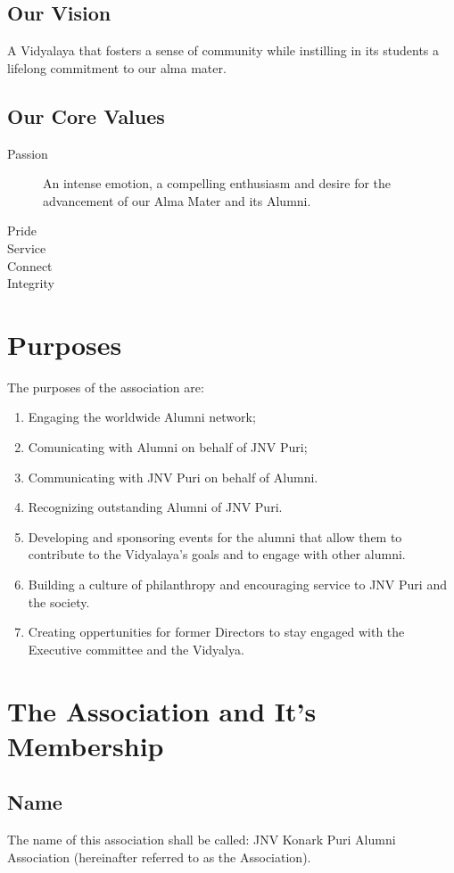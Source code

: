 \documentclass[a4paper,11pt]{book}
\begin{document}
\section{Our Vision}
A Vidyalaya that fosters a sense of community while instilling in its students 
a lifelong commitment to our alma mater.

\section{Our Core Values}
\begin{description}
\item [Passion] An intense emotion, a compelling enthusiasm and desire for the 
advancement of our Alma Mater and its Alumni.
\item [Pride] 
\item [Service]
\item [Connect]
\item [Integrity]
\end{description}


\chapter{Purposes}
The purposes of the association are:
\begin{enumerate}
\item Engaging the worldwide Alumni network;
\item Comunicating with Alumni on behalf of JNV Puri;
\item Communicating with JNV Puri on behalf of Alumni.
\item Recognizing outstanding Alumni of JNV Puri.
\item Developing and sponsoring events for the alumni that allow them to 
contribute to the Vidyalaya's goals and to engage with other alumni.
\item Building a culture of philanthropy and encouraging service to JNV Puri 
and the society.
\item Creating oppertunities for former Directors to stay engaged with the 
Executive committee and the Vidyalya.
\end{enumerate}


\chapter{The Association and It's Membership}
\section{Name}
The name of this association shall be called: JNV Konark Puri Alumni 
Association (hereinafter referred to as the Association).
\end{document}
